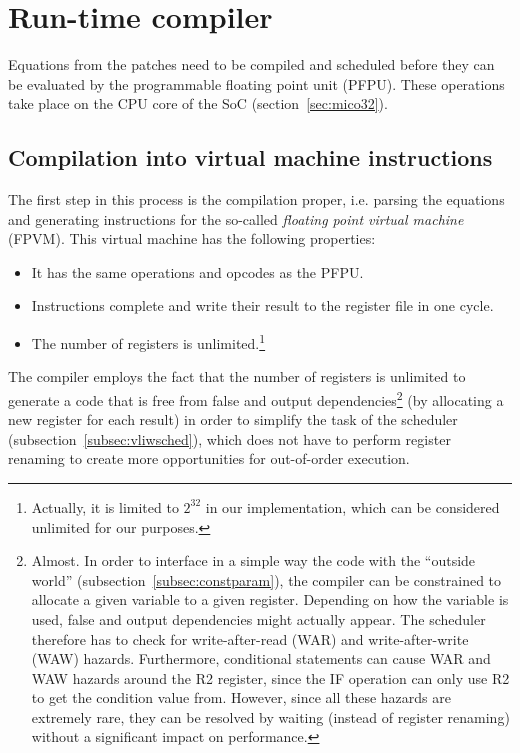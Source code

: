 \documentclass[a4paper,11pt]{kthesis}
\begin{document}
\section{Run-time compiler}
\label{sec:pfpucomp}
Equations from the patches need to be compiled and scheduled before they can be evaluated by the programmable floating point unit (PFPU). These operations take place on the CPU core of the SoC (section~\ref{sec:mico32}).

\subsection{Compilation into virtual machine instructions}
\label{subsec:fpvm}
The first step in this process is the compilation proper, i.e. parsing the equations and generating instructions for the so-called \textit{floating point virtual machine} (FPVM). This virtual machine has the following properties:
\begin{itemize}
\item It has the same operations and opcodes as the PFPU.
\item Instructions complete and write their result to the register file in one cycle.
\item The number of registers is unlimited.\footnote{Actually, it is limited to $2^{32}$ in our implementation, which can be considered unlimited for our purposes.}
\end{itemize}

The compiler employs the fact that the number of registers is unlimited to generate a code that is free from false and output dependencies\footnote{Almost. In order to interface in a simple way the code with the ``outside world'' (subsection~\ref{subsec:constparam}), the compiler can be constrained to allocate a given variable to a given register. Depending on how the variable is used, false and output dependencies might actually appear. The scheduler therefore has to check for write-after-read (WAR) and write-after-write (WAW) hazards. Furthermore, conditional statements can cause WAR and WAW hazards around the R2 register, since the IF operation can only use R2 to get the condition value from. However, since all these hazards are extremely rare, they can be resolved by waiting (instead of register renaming) without a significant impact on performance.} (by allocating a new register for each result) in order to simplify the task of the scheduler (subsection~\ref{subsec:vliwsched}), which does not have to perform register renaming to create more opportunities for out-of-order execution.
\end{document}
